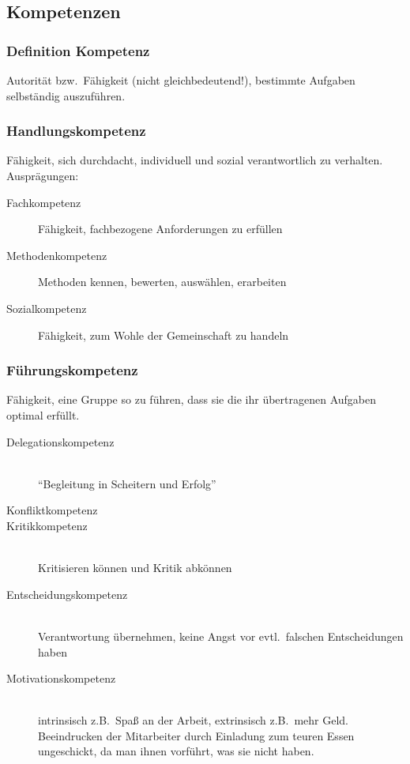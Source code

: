\documentclass[a4paper, 12pt]{article}
\begin{document}
\subsection{Kompetenzen}

\subsubsection*{Definition Kompetenz}
Autorität bzw.\ Fähigkeit (nicht gleichbedeutend!), bestimmte Aufgaben selbständig auszuführen.


\subsubsection*{Handlungskompetenz}
Fähigkeit, sich durchdacht, individuell und sozial verantwortlich zu verhalten. Ausprägungen:
\begin{description}
  \item[Fachkompetenz] Fähigkeit, fachbezogene Anforderungen zu erfüllen
  \item[Methodenkompetenz] Methoden kennen, bewerten, auswählen, erarbeiten
  \item[Sozialkompetenz] Fähigkeit, zum Wohle der Gemeinschaft zu handeln
\end{description}

\subsubsection*{Führungskompetenz}
Fähigkeit, eine Gruppe so zu führen, dass sie die ihr übertragenen Aufgaben optimal erfüllt.
\begin{description}
  \item[Delegationskompetenz]~\\
    ``Begleitung in Scheitern und Erfolg''
  \item[Konfliktkompetenz]
  \item[Kritikkompetenz]~\\
    Kritisieren können und Kritik abkönnen
  \item[Entscheidungskompetenz]~\\
    Verantwortung übernehmen, keine Angst vor evtl.\ falschen Entscheidungen haben
  \item[Motivationskompetenz]~\\
    intrinsisch z.B.\ Spaß an der Arbeit, extrinsisch z.B.\ mehr Geld. Beeindrucken der Mitarbeiter durch Einladung zum teuren Essen ungeschickt, da man ihnen vorführt, was sie nicht haben.
\end{description}
\end{document}
